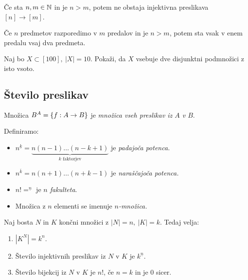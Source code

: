 \begin{trditev}
    Če sta $n, m \in \mathbb{N}$ in je $n > m$, potem ne obstaja injektivna preslikava $[n] \to [m]$.
\end{trditev}

\begin{opomba}
    Če $n$ predmetov razporedimo v $m$ predalov in je $n > m$, potem sta vsak v enem predalu vsaj dva predmeta.
\end{opomba}

\begin{primer}
    Naj bo $X \subset [100], \ |X|=10$. Pokaži, da $X$ vsebuje dve disjunktni podmnožici z isto vsoto.
\end{primer}

\subsection{Število preslikav}
\begin{definicija}
    Množica $B^A = \left\{f: A \to B\right\}$ je \emph{množica vseh preslikav iz $A$ v $B$}.
\end{definicija}

\begin{definicija} Definiramo:
    \begin{itemize}
        \item $n^{\underline{k}} = \underbrace{n(n-1) \ldots (n-k+1)}_\text{$k$ faktorjev}$ je \emph{padajoča potenca.}
        \item $n^{\overline{k}} = n(n+1) \ldots (n+k-1)$ je \emph{naraščajoča potenca.}
        \item $n! = ^{\underline{n}}$ je \emph{$n$ fakulteta}.
        \item Množica z $n$ elementi se imenuje \emph{$n$-množica.}
    \end{itemize}
\end{definicija}

\begin{trditev}
    Naj bosta $N$ in $K$ končni množici z $|N| = n, \ |K| = k$. Tedaj velja:
    \begin{enumerate}
        \item $|K^N| = k^n$.
        \item Število injektivnih preslikav iz $N$ v $K$ je $k^{\underline{n}}$.
        \item Število bijekcij iz $N$ v $K$ je $n!$, če $n = k$ in je $0$ sicer.
    \end{enumerate} 
\end{trditev}

